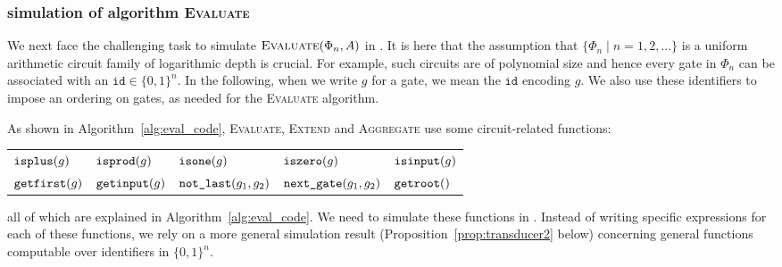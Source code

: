  




\subsubsection{\langfor simulation of algorithm {\normalfont \textsc{Evaluate}}}\label{subsubsec:simulate}
We next face the challenging task to simulate $\textsc{Evaluate}(\Phi_n,A)$ in \langfor. It is here that the
assumption that  $\{\Phi_n\mid n=1,2,\ldots\}$ is a uniform arithmetic circuit family of logarithmic depth is crucial.
For example, such circuits are of polynomial size and hence every gate in $\Phi_n$ can be associated with an $\texttt{id}\in\lbrace 0,1 \rbrace^n$. In the following, when we write $g$ for a gate, we mean the $\texttt{id}$ encoding $g$. We also use these identifiers to impose an
ordering on gates, as needed for the \textsc{Evaluate} algorithm. 


As shown in Algorithm~\ref{alg:eval_code}, \textsc{Evaluate}, \textsc{Extend} and \textsc{Aggregate} use some circuit-related functions:
\begin{center}
	\begin{tabular}{lllll}
		$\texttt{isplus}(g)$ & $\texttt{isprod}(g)$ & $\texttt{isone}(g)$ & $\texttt{iszero}(g)$ & $\texttt{isinput}(g)$ \\ $\texttt{getfirst}(g)$ & $\texttt{getinput}(g)$ & $\texttt{not{\_}last}(g_1,g_2)$ &
		$\texttt{next{\_}gate}(g_1, g_2)$ & $\texttt{getroot}()$
	\end{tabular}
\end{center}
all of which are explained in Algorithm~\ref{alg:eval_code}. 
We need to simulate these functions in \langfor. Instead of writing specific \langfor expressions for each of these
functions, we rely on a more general simulation result (Proposition~\ref{prop:transducer2} below) concerning general
functions computable over identifiers in $\{0,1\}^n$.

